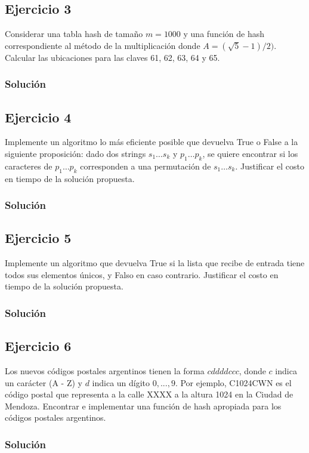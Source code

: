 \documentclass{article}
\begin{document}
\subsection*{Ejercicio 3}
Considerar una tabla hash de tamaño $m = 1000$ y una función de hash correspondiente al método de la multiplicación donde $A = (\sqrt{5}-1)/2)$. Calcular las ubicaciones para las claves 61, 62, 63, 64 y 65.
\subsubsection*{Solución}


\subsection*{Ejercicio 4}
Implemente un algoritmo lo más eficiente posible que devuelva True o False a la siguiente proposición: dado dos strings $s_1 \dots s_k$ y $p_1 \dots p_k$, se quiere encontrar si los caracteres de $p_1 \dots p_k$ corresponden a una permutación de $s_1 \dots s_k$. Justificar el costo en tiempo de la solución propuesta.
\subsubsection*{Solución}


\subsection*{Ejercicio 5}
Implemente un algoritmo que devuelva True si la lista que recibe de entrada tiene todos sus elementos únicos, y Falso en caso contrario. Justificar el costo en tiempo de la solución propuesta.
\subsubsection*{Solución}


\subsection*{Ejercicio 6}
Los nuevos códigos postales argentinos tienen la forma $cddddccc$, donde $c$ indica un carácter (A - Z) y $d$ indica un dígito $0, ... , 9$. Por ejemplo, C1024CWN es el código postal que representa a la calle XXXX a la altura 1024 en la Ciudad de Mendoza. Encontrar e implementar una función de hash apropiada para los códigos postales argentinos.
\subsubsection*{Solución}
\end{document}
